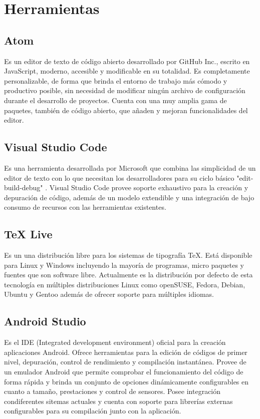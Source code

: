 \documentclass{article}
\begin{document}
\section{Herramientas} 

    \subsection{Atom}
        Es un editor de texto de código abierto desarrollado por GitHub Inc., escrito en JavaScript, moderno, accesible y modificable en su totalidad. Es completamente personalizable, de forma que brinda el entorno de trabajo más cómodo y productivo posible, sin necesidad de modificar ningún archivo de configuración durante el desarrollo de proyectos. Cuenta con una muy amplia gama de paquetes, también de código abierto, que añaden y mejoran funcionalidades del editor.

    \subsection{Visual Studio Code}
        Es una herramienta desarrollada por Microsoft que combina las simplicidad de un editor de texto con lo que necesitan los desarrolladores para su ciclo básico "edit-build-debug" . Visual Studio Code provee soporte exhaustivo para la creación y depuración de código, además de un modelo extendible y una integración de bajo consumo de recursos con las herramientas existentes.

    \subsection{TeX Live}
        Es un una distribución libre para los sistemas de tipografía TeX. Está disponible para Linux y Windows incluyendo la mayoría de programas, micro paquetes y fuentes que son software libre. Actualmente es la distribución por defecto de esta tecnología en múltiples distribuciones Linux como openSUSE, Fedora, Debian, Ubuntu y Gentoo además de ofrecer soporte para múltiples idiomas.

    \subsection{Android Studio}
        Es el IDE (Integrated development environment) oficial para la creación aplicaciones Android. Ofrece herramientas para la edición de códigos de primer nivel, depuración, control de rendimiento y compilación instantánea. Provee de un emulador Android que permite comprobar el funcionamiento del código de forma rápida y brinda un conjunto de opciones dinámicamente configurables en cuanto a tamaño, prestaciones y control de sensores. Posee integración condiferentes sitemas actuales y cuenta con soporte para librerías externas configurables para su compilación junto con la aplicación.
\end{document}
